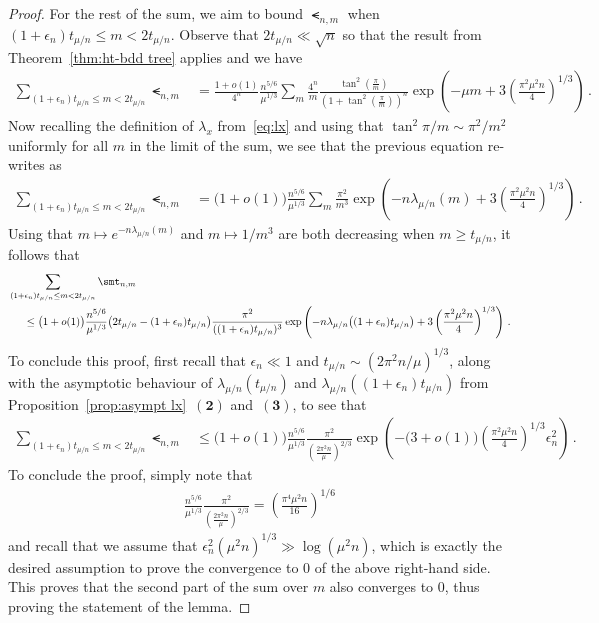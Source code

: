 \documentclass{article}
\newcommand{\1}{\mathbbm{1}}								%
\theoremstyle{definition}
\numberwithin{equation}{section}
\newcommand{\numitem}[1]{$\mathbf{(#1)}$}
\begin{document}
\begin{proof}
    For the rest of the sum, we aim to bound $\smt_{n,m}$ when $(1+\epsilon_n)t_{\mu/n}\leq m<2t_{\mu/n}$.
    Observe that $2t_{\mu/n}\ll\sqrt{n}$ so that the result from Theorem~\ref{thm:ht-bdd tree} applies and we have
    \begin{align*}
        \sum_{(1+\epsilon_n)t_{\mu/n}\leq m<2t_{\mu/n}}\smt_{n,m}&=\frac{1+o(1)}{4^n}\frac{n^{5/6}}{\mu^{1/3}}\sum_m\frac{4^n}{m}\frac{\tan^2\left(\frac{\pi}{m}\right)}{\left(1+\tan^2\left(\frac{\pi}{m}\right)\right)^n}\exp\left(-\mu m+3\left(\frac{\pi^2\mu^2n}{4}\right)^{1/3}\right)\,.
    \end{align*}
    Now recalling the definition of $\lambda_x$ from~\eqref{eq:lx} and using that $\tan^2\pi/m\sim\pi^2/m^2$ uniformly for all $m$ {in the limit of} the sum, we see that the previous equation re-writes as
    \begin{align*}
        \sum_{(1+\epsilon_n)t_{\mu/n}\leq m<2t_{\mu/n}}\smt_{n,m}&=\big(1+o(1)\big)\frac{n^{5/6}}{\mu^{1/3}}\sum_m\frac{\pi^2}{m^3}\exp\left(-n\lambda_{\mu/n}(m)+3\left(\frac{\pi^2\mu^2n}{4}\right)^{1/3}\right)\,.
    \end{align*}
    Using that $m\mapsto e^{-n\lambda_{\mu/n}(m)}$ and $m\mapsto1/m^3$ are both decreasing when $m\geq t_{\mu/n}$, it follows that
    \begin{align*}
        &\sum_{(1+\epsilon_n)t_{\mu/n}\leq m<2t_{\mu/n}}\smt_{n,m}\\
        &\hspace{0.5cm}\leq\big(1+o(1)\big)\frac{n^{5/6}}{\mu^{1/3}}\big(2t_{\mu/n}-(1+\epsilon_n)t_{\mu/n}\big)\frac{\pi^2}{((1+\epsilon_n)t_{\mu/n})^3}\exp\left(-n\lambda_{\mu/n}\big((1+\epsilon_n)t_{\mu/n}\big)+3\left(\frac{\pi^2\mu^2n}{4}\right)^{1/3}\right)\,.
    \end{align*}
    To conclude this proof, first recall that $\epsilon_n\ll1$ and $t_{\mu/n}\sim(2\pi^2n/\mu)^{1/3}$, along with the asymptotic behaviour of $\lambda_{\mu/n}(t_{\mu/n})$ and $\lambda_{\mu/n}((1+\epsilon_n)t_{\mu/n})$ from Proposition~\ref{prop:asympt lx}~\numitem{2} and~\numitem{3}, to see that
    \begin{align*}
        \sum_{(1+\epsilon_n)t_{\mu/n}\leq m<2t_{\mu/n}}\smt_{n,m}&\leq\big(1+o(1)\big)\frac{n^{5/6}}{\mu^{1/3}}\frac{\pi^2}{\left(\frac{2\pi^2n}{\mu}\right)^{2/3}}\exp\left(-\big(3+o(1)\big)\left(\frac{\pi^2\mu^2n}{4}\right)^{1/3}\epsilon_n^2\right)\,.
    \end{align*}
    To conclude the proof, simply note that
    \begin{align*}
        \frac{n^{5/6}}{\mu^{1/3}}\frac{\pi^2}{\left(\frac{2\pi^2n}{\mu}\right)^{2/3}}=\left(\frac{\pi^4\mu^2n}{16}\right)^{1/6}
    \end{align*}
    and recall that we assume that $\epsilon_n^2(\mu^2n)^{1/3}\gg\log(\mu^2n)$, which is exactly the desired assumption to prove the convergence to $0$ of the above right-hand side.
    This proves that the second part of the sum over $m$ also converges to $0$, thus proving the statement of the lemma.
\end{proof}
\end{document}
